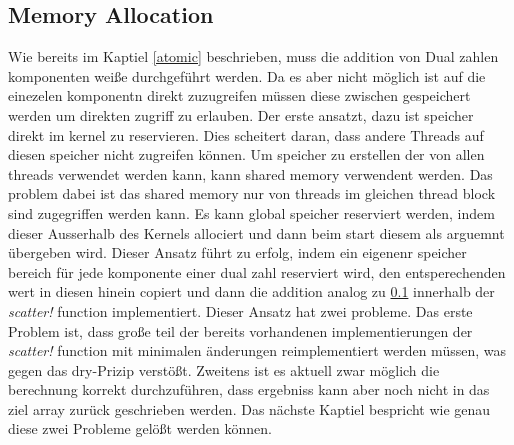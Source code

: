 \subsection{Memory Allocation}

Wie bereits im Kaptiel \ref{atomic} beschrieben, muss die addition von Dual zahlen komponenten weiße durchgeführt werden.
Da es aber nicht möglich ist auf die einezelen komponentn direkt zuzugreifen müssen diese zwischen gespeichert werden um direkten zugriff zu erlauben.
Der erste ansatzt, dazu ist speicher direkt im kernel zu reservieren.
Dies scheitert daran, dass andere Threads auf diesen speicher nicht zugreifen können.
Um speicher zu erstellen der von allen threads verwendet werden kann, kann shared memory verwendent werden.
Das problem dabei ist das shared memory nur von threads im gleichen thread block sind zugegriffen werden kann.
Es kann global speicher reserviert werden, indem dieser Ausserhalb des Kernels allociert und dann beim start diesem als arguemnt übergeben wird.
Dieser Ansatz führt zu erfolg, indem ein eigenenr speicher bereich für jede komponente einer dual zahl reserviert wird, den entsperechenden wert in diesen hinein copiert
und dann die addition analog zu \ref{} innerhalb der \textit{scatter!} function implementiert.
Dieser Ansatz hat zwei probleme.
Das erste Problem ist, dass große teil der bereits vorhandenen implementierungen der \textit{scatter!} function mit minimalen änderungen reimplementiert werden müssen, was 
gegen das dry-Prizip verstößt.
Zweitens ist es aktuell zwar möglich die berechnung korrekt durchzuführen, dass ergebniss kann aber noch nicht in das ziel array zurück geschrieben werden.
Das nächste Kaptiel bespricht wie genau diese zwei Probleme gelößt werden können.

